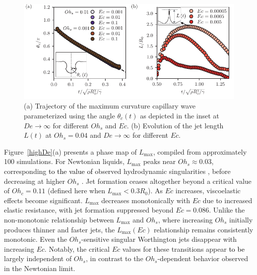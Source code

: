 \documentclass{jfm}
\newcommand{\DL}[1]{{\textcolor{black}{#1}}}
\newcommand{\AO}[1]{{\textcolor{black}{#1}}}
\begin{document}
\begin{figure}
	\includegraphics[width=\textwidth]{Figures/L-theta_t/theta_t_02-eps-converted-to.pdf}
	\caption{(a) Trajectory of the maximum curvature capillary wave parameterized using the angle $\theta_c(t)$ as depicted in the inset at $De \to \infty$ for different $Oh_s$ and $Ec$. (b) Evolution of the jet length $L(t)$ at $Oh_s = 0.04$ and $De \to \infty$ for different $Ec$.}
	\label{theta_time}
\end{figure}

Figure~\ref{highDe}(a) presents a phase map of $L_{\text{max}}$, compiled from approximately 100 simulations.
For Newtonian liquids, $L_{\text{max}}$ peaks near $Oh_s \approx 0.03$, corresponding \AO{to the value of} observed hydrodynamic singularities \citep{zeff2000singularity,lohse2003bubble,eggers2015singularities,yang2020multitude}, before decreasing at higher $Oh_s$ \citep{duchemin2002jet,deike2018dynamics,gordillo2019capillary}.
Jet formation ceases altogether beyond a critical value of $Oh_c = 0.11$ \citep{sanjay2021bursting} (defined here when $L_\text{max} < 0.3R_0$).
As $Ec$ increases, viscoelastic effects become significant. $L_{\text{max}}$ decreases monotonically with $Ec$ due to increased elastic resistance, with jet formation suppressed beyond $Ec=0.086$. Unlike the non-monotonic relationship between $L_{\text{max}}$ and $Oh_s$, where increasing $Oh_s$ initially produces thinner and faster jets, the $L_{\text{max}}(Ec)$ relationship remains consistently monotonic. Even the $Oh_s$-sensitive singular Worthington jets disappear with increasing $Ec$. Notably, the critical $Ec$ values for these transitions appear \DL{to be} largely independent of $Oh_s$, in contrast to the $Oh_s$-dependent behavior observed in the Newtonian limit.
\end{document}
